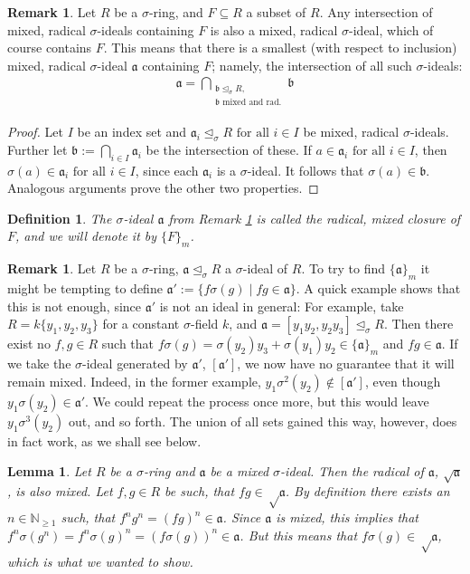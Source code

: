 \documentclass{article}
\def\NE{\mathbb{N}_{\geq1}}
\def\a{\mathfrak{a}}
\def\b{\mathfrak{b}}
\def\s{\sigma}
\def\si{\unlhd_{\sigma}}
\def\fa{\text{ for all }}
\theoremstyle{plain}
\newtheorem{lem}[Satz]{Lemma}
\newtheorem{defn}[Satz]{Definition}
\theoremstyle{definition}
\newtheorem{rem}[Satz]{Remark}
\begin{document}
\begin{rem}\label{wmwelldef}
Let $R$ be a $\s$-ring, and $F \subseteq R$ a subset of $R$. Any intersection of mixed, radical $\s$-ideals containing $F$ is also a mixed, radical $\s$-ideal, which of course contains $F$. 
This means that there is a smallest (with respect to inclusion) mixed, radical $\s$-ideal $\a$ containing $F$; namely, the intersection of all such $\s$-ideals:
\begin{align*} \a = \bigcap_{\substack{ \b \si R, \\ \b \text{ mixed and rad.}}} \b \end{align*}
\begin{proof}
Let $I$ be an index set and $\a_i \si R \fa i \in I$ be mixed, radical $\s$-ideals. Further let $\b := \bigcap_{i \in I} \a_i$ be the intersection of these. If $a \in \a_i \fa i \in I$, then $\s(a) \in \a_i \fa i \in I$, since each $\a_i$ is a $\s$-ideal.
It follows that $\s(a) \in \b$. Analogous arguments prove the other two properties.
\end{proof}
\end{rem}

\begin{defn}
The $\s$-ideal $\a$ from Remark \ref{wmwelldef} is called the radical, mixed closure of $F$, and we will denote it by $\{F\}_{m}$.
\end{defn}

\begin{rem}\label{remshuffling}
Let $R$ be a $\s$-ring, $\a \si R$ a $\s$-ideal of $R$. To try to find $\{\a\}_m$ it might be tempting to define $\a':= \{ f\s(g) \mid fg \in \a \}$. A quick example shows that this is not enough, since $\a'$ is not an ideal in general: 
For example, take $R=k\{y_1,y_2,y_3\}$ for a constant $\s$-field $k$, and $\a = [y_1y_2, y_2y_3] \si R$. Then there exist no $f,g \in R$ such that $ f \s(g) = \s(y_2)y_3 + \s(y_1)y_2 \in \{\a\}_m$ and $fg \in \a$. 
If we take the $\s$-ideal generated by $\a'$, $[\a']$, we now have no guarantee that it will remain mixed. Indeed, in the former example, $y_1\s^2(y_2) \notin [\a']$, even though $y_1 \s(y_2) \in \a'$. We could repeat the process once more,
 but this would leave $y_1 \s^3(y_2)$ out, and so forth. The union of all sets gained this way, however, does in fact work, as we shall see below.
\end{rem}

\begin{lem}\label{sqrtmixed}
Let $R$ be a $\s$-ring and $\a$ be a mixed $\s$-ideal. Then the radical of $\a$, $\sqrt{\a}$, is also mixed.
Let $f,g \in R$ be such, that $fg \in \sqrt \a$. By definition there exists an $n \in \NE$ such, that $f^n g^n = (fg)^n \in \a$. Since $\a$ is mixed, this implies that $f^n \s(g^n) = f^n \s(g)^n = (f\s(g))^n \in \a$. 
But this means that $f\s(g) \in \sqrt \a$, which is what we wanted to show.
\end{lem}
\end{document}
